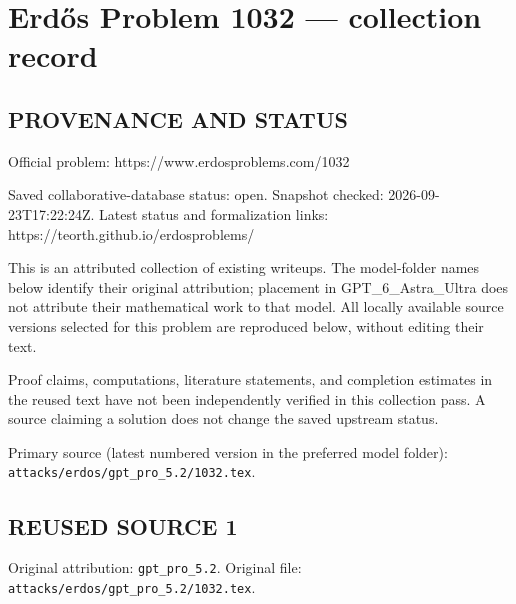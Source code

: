 \section*{Erd\H{o}s Problem 1032 --- collection record}

\subsection*{PROVENANCE AND STATUS}
Official problem: https://www.erdosproblems.com/1032

Saved collaborative-database status: open.
Snapshot checked: 2026-09-23T17:22:24Z.
Latest status and formalization links: https://teorth.github.io/erdosproblems/

This is an attributed collection of existing writeups. The model-folder names below identify their original attribution; placement in GPT\_6\_Astra\_Ultra does not attribute their mathematical work to that model. All locally available source versions selected for this problem are reproduced below, without editing their text.

Proof claims, computations, literature statements, and completion estimates in the reused text have not been independently verified in this collection pass. A source claiming a solution does not change the saved upstream status.

Primary source (latest numbered version in the preferred model folder): \texttt{attacks/erdos/gpt\_pro\_5.2/1032.tex}.

\subsection*{REUSED SOURCE 1}
Original attribution: \texttt{gpt\_pro\_5.2}.
Original file: \texttt{attacks/erdos/gpt\_pro\_5.2/1032.tex}.


